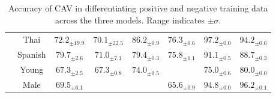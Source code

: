 \begin{table}[H]
\begin{tabular}{|c|c|cc|cc|cc|}
                                                                                 & Thai                              & \multicolumn{1}{c|}{$72.2_{\pm 19.9}$}                    & $70.1_{\pm 22.5}$                     & \multicolumn{1}{c|}{$86.2_{\pm 0.9}$}                     & $76.3_{\pm 0.6}$                     & \multicolumn{1}{c|}{$97.2_{\pm 0.0}$}                     & $94.2_{\pm 0.6}$ \\
                                                                                 & Spanish                           & \multicolumn{1}{c|}{$79.7_{\pm 2.6}$}                     & $71.0_{\pm 7.1}$                      & \multicolumn{1}{c|}{$79.4_{\pm 0.3}$}                     & $75.8_{\pm 1.1}$                     & \multicolumn{1}{c|}{$91.1_{\pm 0.5}$}                     & $88.7_{\pm 0.3}$ \\ \cline{2-8}
                                                                                 & Young                             & \multicolumn{1}{c|}{$67.3_{\pm 2.5}$}                     & $67.3_{\pm 0.8}$                      & \multicolumn{1}{c|}{$74.0_{\pm 0.5}$}                     & \cellcolor{red!15}{$56.4_{\pm 0.3}$} & \multicolumn{1}{c|}{$75.0_{\pm 0.6}$}                     & $80.0_{\pm 0.0}$ \\ \cline{2-8}
                                                                                 & Male                              & \multicolumn{1}{c|}{$69.5_{\pm 6.1}$}                     & \cellcolor{red!15}{$51.7_{\pm 9.1}$}  & \multicolumn{1}{c|}{\cellcolor{red!15}{$59.2_{\pm 0.5}$}} & $65.6_{\pm 0.9}$                     & \multicolumn{1}{c|}{$94.8_{\pm 0.0}$}                     & $96.2_{\pm 0.1}$ \\ \hline
    \end{tabular}

    \caption{Accuracy of CAV in differentiating positive and negative training data across the three models. Range indicates $\pm \sigma$.}
    \label{tab:CAV_accuracy_combined}
\end{table}

